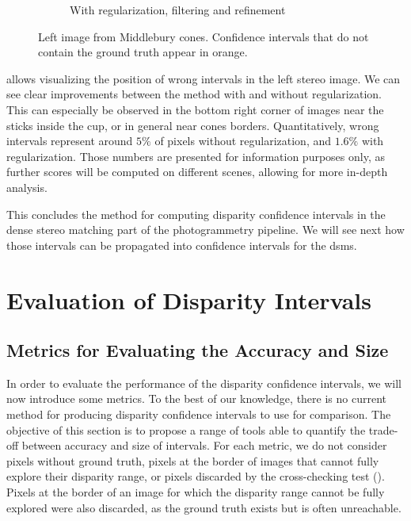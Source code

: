 \begin{figure}
\begin{subfigure}[t]{0.49\linewidth}
        \caption{With regularization, filtering and refinement}
        \label{fig:comparison_wrong_intervals_reg}
    \end{subfigure}
    \caption{Left image from Middlebury cones. Confidence intervals that do not contain the ground truth appear in orange.}
    \label{fig:comparison_wrong_intervals}
\end{figure}

 allows visualizing the position of wrong intervals in the left stereo image. We can see clear improvements between the method with and without regularization. This can especially be observed in the bottom right corner of images near the sticks inside the cup, or in general near cones borders. Quantitatively, wrong intervals represent around $5\%$ of pixels without regularization, and $1.6\%$ with regularization. Those numbers are presented for information purposes only, as further scores will be computed on different scenes, allowing for more in-depth analysis.

This concludes the method for computing disparity confidence intervals in the dense stereo matching part of the photogrammetry pipeline. We will see next how those intervals can be propagated into confidence intervals for the \acrshort{dsm}s.

\section{Evaluation of Disparity Intervals}
\subsection{Metrics for Evaluating the Accuracy and Size}\label{sec:metrics_disparity}
In order to evaluate the performance of the disparity confidence intervals, we will now introduce some metrics. To the best of our knowledge, there is no current method for producing disparity confidence intervals to use for comparison. The objective of this section is to propose a range of tools able to quantify the trade-off between accuracy and size of intervals. For each metric, we do not consider pixels without ground truth, pixels at the border of images that cannot fully explore their disparity range, or pixels discarded by the cross-checking test (). Pixels at the border of an image  for which the disparity range cannot be fully explored were also discarded, as the ground truth exists but is often unreachable. 

